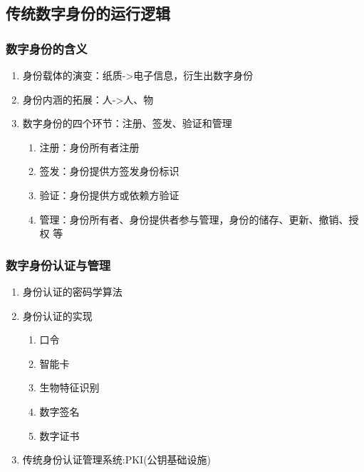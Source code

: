\documentclass[11pt]{beamer}
\begin{document}
\subsection{传统数字身份的运行逻辑}
\begin{frame}
	\frametitle{数字身份的含义}
	\begin{enumerate}
		\item
		      身份载体的演变：纸质->电子信息，衍生出数字身份
		\item  身份内涵的拓展：人->人、物
		\item 数字身份的四个环节：注册、签发、验证和管理
		      \begin{enumerate}
			      \item 注册：身份所有者注册
			      \item 签发：身份提供方签发身份标识
			      \item 验证：身份提供方或依赖方验证
			      \item 管理：身份所有者、身份提供者参与管理，身份的储存、更新、撤销、授权
			            等
		      \end{enumerate}
	\end{enumerate}
\end{frame}

\begin{frame}
	\frametitle{数字身份认证与管理}
	\begin{enumerate}
		\item 身份认证的密码学算法
		\item 身份认证的实现
		      \begin{enumerate}
			      \item 口令
			      \item 智能卡
			      \item 生物特征识别
			      \item 数字签名
			      \item 数字证书
		      \end{enumerate}
		\item 传统身份认证管理系统:PKI(公钥基础设施)
	\end{enumerate}
\end{frame}
\end{document}
